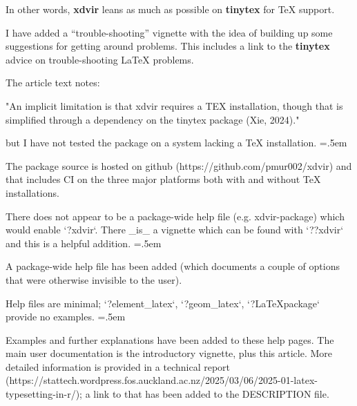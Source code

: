 \documentclass{article}
\newenvironment{lcverbatim}
 {\SaveVerbatim{cverb}}
 {\endSaveVerbatim
  \flushleft\fboxrule=0pt\fboxsep=.5em
  \colorbox{cverbbg}{%
    \makebox[\dimexpr\linewidth-2\fboxsep][l]{\BUseVerbatim{cverb}}%
  }
  \endflushleft
}
\begin{document}
In other words, \textbf{xdvir} leans as much as possible on 
\textbf{tinytex} for \TeX{} support.

I have added a ``trouble-shooting'' vignette with the idea of 
building up some suggestions for getting around problems.  This
includes a link to the \textbf{tinytex} advice on trouble-shooting
\LaTeX{} problems.

\begin{lcverbatim}
  The article text notes:

  "An implicit limitation is that xdvir requires a TEX installation, though that
  is simplified through a dependency on the tinytex package (Xie, 2024)."

  but I have not tested the package on a system lacking a TeX installation.
\end{lcverbatim}

The package source is hosted on github (https://github.com/pmur002/xdvir)
and that includes CI on the three major platforms both with and without
TeX installations.

\begin{lcverbatim}
  There does not appear to be a package-wide help file (e.g. xdvir-package) 
  which would enable `?xdvir`. There _is_ a vignette which can be found with 
  `??xdvir` and this is a helpful addition.
\end{lcverbatim}

A package-wide help file has been added (which documents a couple of
options that were otherwise invisible to the user).

\begin{lcverbatim}
  Help files are minimal; `?element_latex`, `?geom_latex`, `?LaTeXpackage` 
  provide no examples.
\end{lcverbatim}

Examples and further explanations
have been added to these help pages.
The main user documentation is the introductory vignette,
plus this article.
More detailed information is provided in a technical report
(https://stattech.wordpress.fos.auckland.ac.nz/2025/03/06/2025-01-latex-typesetting-in-r/);  a link to that has been added to the DESCRIPTION file.
\end{document}
